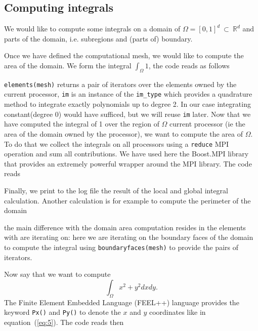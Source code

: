 \subsection{Computing integrals}
\label{sec:computing-integrals}

We would like to compute some integrals on a domain of $\Omega=[0,1]^d\ \subset\ \mathbb{R}^d$
and parts of the domain, i.e. subregions and (parts of) boundary.

Once we have defined the computational mesh, we would like to compute
the area of the domain. We form the integral $\int_\Omega 1$, the code
reads as follows



\lstinline!elements(mesh)! returns a pair of iterators over the
elements owned by the current processor, \lstinline!im! is an instance
of the \lstinline!im_type! which provides a quadrature method to
integrate exactly polynomials up to degree 2. In our case integrating
constant(degree 0) would have sufficed, but we will reuse
\lstinline!im! later. Now that we have computed the integral of 1 over
the region of $\Omega$ current processor (ie the area of the domain
owned by the processor), we want to compute the area of $\Omega$. To
do that we collect the integrals on all processors using a
\lstinline!reduce! MPI operation and sum all contributions. We have
used here the Boost.MPI library that provides an extremely powerful
\cpp wrapper around the MPI library. The code reads



\noindent
Finally, we print to the log file the result of the local and global
integral calculation. Another calculation is for example to compute
the perimeter of the domain



\noindent
the main difference with the domain area computation resides in the
elements with are iterating on: here we are iterating on the boundary
faces of the domain to compute the integral using
\lstinline!boundaryfaces(mesh)! to provide the pairs of iterators.


Now say that we want to compute
\begin{equation}
  \label{eq:5}
  \int_\Omega x^2 + y^2 dx dy.
\end{equation}
The Finite Element Embedded Language (FEEL++) language provides the
keyword \lstinline!Px()! and \lstinline!Py()! to denote the $x$ and
$y$ coordinates like in equation~(\ref{eq:5}).  The code reads then


